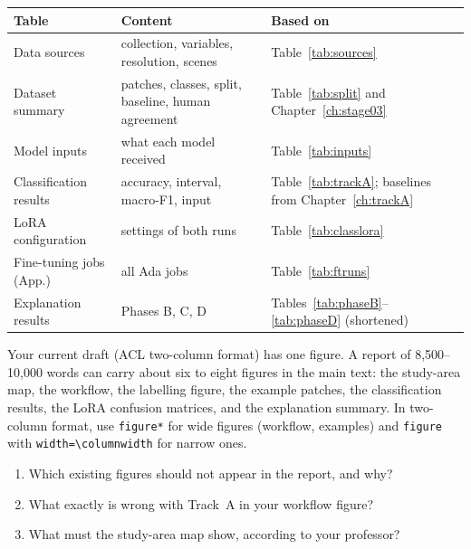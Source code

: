 \begin{table}[H]
\centering
\small
\begin{tabularx}{\textwidth}{lYl}
\toprule
Table & Content & Based on \\
\midrule
Data sources & collection, variables, resolution, scenes & Table~\ref{tab:sources} \\
Dataset summary & patches, classes, split, baseline, human agreement & Table~\ref{tab:split} and Chapter~\ref{ch:stage03} \\
Model inputs & what each model received & Table~\ref{tab:inputs} \\
Classification results & accuracy, interval, macro-F1, input & Table~\ref{tab:trackA}; baselines from Chapter~\ref{ch:trackA} \\
LoRA configuration & settings of both runs & Table~\ref{tab:classlora} \\
Fine-tuning jobs (App.) & all Ada jobs & Table~\ref{tab:ftruns} \\
Explanation results & Phases B, C, D & Tables~\ref{tab:phaseB}--\ref{tab:phaseD} (shortened) \\
\bottomrule
\end{tabularx}
\end{table}

\begin{foryourreport}
Your current draft (ACL two-column format) has one figure. A report of 8,500--10,000 words can carry about six to eight figures in the main text: the study-area map, the workflow, the \dndvi{} labelling figure, the example patches, the classification results, the LoRA confusion matrices, and the explanation summary. In two-column format, use \texttt{figure*} for wide figures (workflow, examples) and \texttt{figure} with \texttt{width=\textbackslash columnwidth} for narrow ones.
\end{foryourreport}

\begin{selfcheck}
\begin{enumerate}
  \item Which existing figures should not appear in the report, and why?
  \item What exactly is wrong with Track~A in your workflow figure?
  \item What must the study-area map show, according to your professor?
\end{enumerate}
\end{selfcheck}
